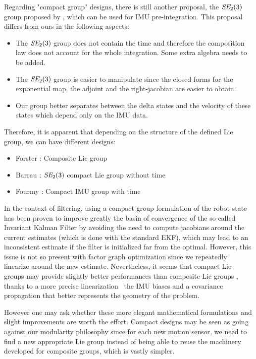 Regarding "compact group" designs, there is still another proposal, the $\textit{SE}_2(3)$ group proposed by \cite{barrau2020mathematical, brossard2021associating}, 
which can be used for IMU pre-integration. This proposal differs from ours in the following aspects:

\begin{itemize}
    \item The $\textit{SE}_2(3)$ group does not contain the time and therefore the composition law does not account for the whole integration. Some extra algebra needs to be added.
    \item The $\textit{SE}_2(3)$ group is easier to manipulate since the closed forms for the exponential map, the adjoint and the right-jacobian are easier to obtain.
    \item Our group better separates between the delta states and the velocity of these states which depend only on the IMU data.
\end{itemize}

Therefore, it is apparent that depending on the structure of the defined Lie group, we can have different designs:
\begin{itemize}
    \item Forster \cite{forster2015imu}: Composite Lie group
    \item Barrau \cite{barrau2020mathematical}: $\textit{SE}_2(3)$ compact Lie group without time
    \item Fourmy \cite{fourmy2019absolute}: Compact IMU group with time
\end{itemize}

In the context of filtering, using a compact group formulation of the robot state has been proven to improve greatly the basin of convergence of the so-called
Invariant Kalman Filter \cite{barrau2018invariant, hartley2020contact} by avoiding the need to compute jacobians around the current estimates (which is done
with the standard EKF), which may lead to an inconsistent estimate if the filter is initialized far from the optimal. 
However, this issue is not so present with factor graph optimization since we repeatedly linearize around the new estimate.
Nevertheless, it seems that compact Lie groups may provide slightly better performances than composite Lie groups \cite{brossard2021associating}, thanks 
to a more precise linearization \wrt\ the IMU biases and a covariance propagation that better represents the geometry of the problem.

However one may ask whether these more elegant mathematical formulations and slight improvements are worth the effort. Compact designs may be seen as going against
our modularity philosophy since for each new motion sensor, we need to find a new appropriate Lie group instead of being able to reuse the machinery developed
for composite groups, which is vastly simpler.

